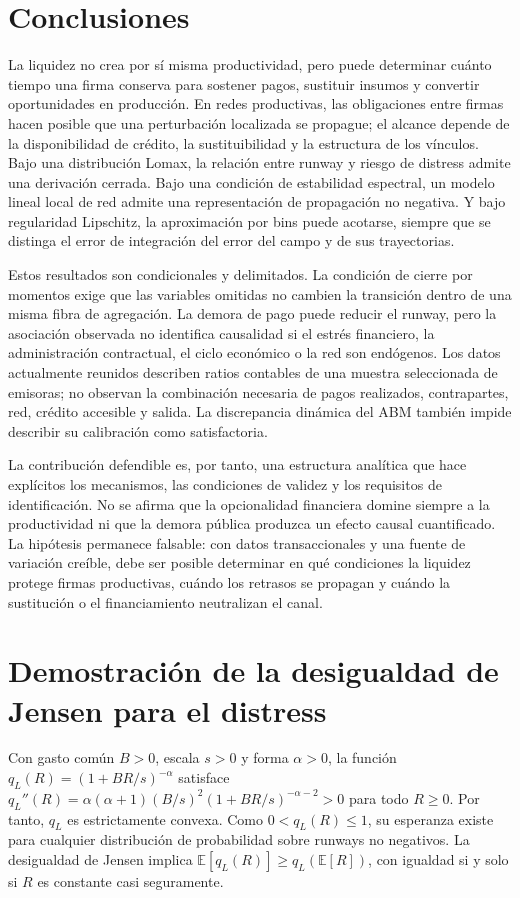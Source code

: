\documentclass[11pt,a4paper]{article}
\begin{document}
\section{Conclusiones}
La liquidez no crea por sí misma productividad, pero puede determinar cuánto tiempo una firma conserva para sostener pagos, sustituir insumos y convertir oportunidades en producción. En redes productivas, las obligaciones entre firmas hacen posible que una perturbación localizada se propague; el alcance depende de la disponibilidad de crédito, la sustituibilidad y la estructura de los vínculos. Bajo una distribución Lomax, la relación entre runway y riesgo de distress admite una derivación cerrada. Bajo una condición de estabilidad espectral, un modelo lineal local de red admite una representación de propagación no negativa. Y bajo regularidad Lipschitz, la aproximación por bins puede acotarse, siempre que se distinga el error de integración del error del campo y de sus trayectorias.

Estos resultados son condicionales y delimitados. La condición de cierre por momentos exige que las variables omitidas no cambien la transición dentro de una misma fibra de agregación. La demora de pago puede reducir el runway, pero la asociación observada no identifica causalidad si el estrés financiero, la administración contractual, el ciclo económico o la red son endógenos. Los datos actualmente reunidos describen ratios contables de una muestra seleccionada de emisoras; no observan la combinación necesaria de pagos realizados, contrapartes, red, crédito accesible y salida. La discrepancia dinámica del ABM también impide describir su calibración como satisfactoria.

La contribución defendible es, por tanto, una estructura analítica que hace explícitos los mecanismos, las condiciones de validez y los requisitos de identificación. No se afirma que la opcionalidad financiera domine siempre a la productividad ni que la demora pública produzca un efecto causal cuantificado. La hipótesis permanece falsable: con datos transaccionales y una fuente de variación creíble, debe ser posible determinar en qué condiciones la liquidez protege firmas productivas, cuándo los retrasos se propagan y cuándo la sustitución o el financiamiento neutralizan el canal.

\appendix
\section{Demostración de la desigualdad de Jensen para el distress}
Con gasto común $B>0$, escala $s>0$ y forma $\alpha>0$, la función $q_L(R)=(1+BR/s)^{-\alpha}$ satisface $q_L''(R)=\alpha(\alpha+1)(B/s)^2(1+BR/s)^{-\alpha-2}>0$ para todo $R\geq0$. Por tanto, $q_L$ es estrictamente convexa. Como $0<q_L(R)\leq1$, su esperanza existe para cualquier distribución de probabilidad sobre runways no negativos. La desigualdad de Jensen implica $\mathbb E[q_L(R)]\geq q_L(\mathbb E[R])$, con igualdad si y solo si $R$ es constante casi seguramente.
\end{document}
